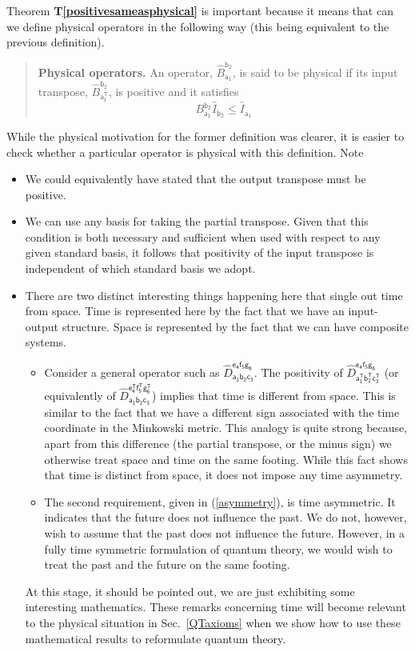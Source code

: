 \documentclass[10pt]{article}
\begin{document}
Theorem {\bf T\ref{positivesameasphysical}} is important because it means that can we define physical operators in the following way (this being equivalent to the previous definition).
\begin{quote}
{\bf Physical operators.}  An operator, $\hat B_\mathsf{a_1}^\mathsf{b_2}$,  is said to be physical if its input transpose, $\hat B_\mathsf{a^T_1}^\mathsf{b_2}$, is positive and it satisfies
\begin{equation}\label{asymmetry}
B_\mathsf{a_1}^\mathsf{b_2}\hat I_\mathsf{b_2} \leq \hat I_\mathsf{a_1}
\end{equation}
\end{quote}
While the physical motivation for the former definition was clearer, it is easier to check whether a particular operator is physical with this definition.  Note \begin{itemize}
\item We could equivalently have stated that the output transpose must be positive.
\item We can use any basis for taking the partial transpose.  Given that this condition is both necessary and sufficient when used with respect to any given standard basis, it follows that positivity of the input transpose is independent of which standard basis we adopt.
\item There are two distinct interesting things happening here that single out time from space.  Time is represented here by the fact that we have an input-output structure. Space is represented by the fact that we can have composite systems.
    \begin{itemize}
    \item Consider a general operator such as $\hat D_\mathsf{a_1b_2c_3}^\mathsf{e_4f_5g_6}$.   The positivity of $\hat D_\mathsf{a^T_1b^T_2c^T_3}^\mathsf{e_4f_5g_6}$ (or equivalently of $\hat D_\mathsf{a_1b_2c_3}^\mathsf{e^T_4f^T_5g^T_6}$) implies that time is different from space. This is similar to the fact that we have a different sign associated with the time coordinate in the Minkowski metric.  This analogy is quite strong because, apart from this difference (the partial transpose, or the minus sign) we otherwise treat space and time on the same footing.  While this fact shows that time is distinct from space, it does not impose any time asymmetry.
    \item The second requirement, given in (\ref{asymmetry}), is time asymmetric.  It indicates that the future does not influence the past.  We do not, however, wish to assume that the past does not influence the future.  However, in a fully time symmetric formulation of quantum theory, we would wish to treat the past and the future on the same footing.
    \end{itemize}
    At this stage, it should be pointed out, we are just exhibiting some interesting mathematics.  These remarks concerning time will become relevant to the physical situation in Sec.\ \ref{QTaxioms} when we show how to use these mathematical results to reformulate quantum theory.
\end{itemize}
\end{document}
